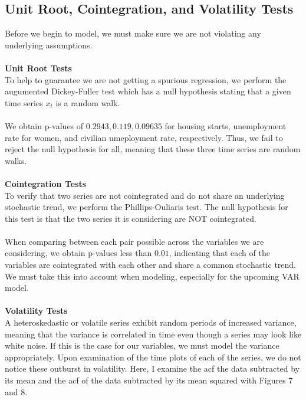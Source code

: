 \documentclass[11pt]{article}
\begin{document}
\subsection{Unit Root, Cointegration, and Volatility Tests}
Before we begin to model, we must make sure we are not violating any underlying assumptions.
\\\\
\textbf{Unit Root Tests}
\\
To help to guarantee we are not getting a spurious regression, we perform the augumented Dickey-Fuller test which has a null hypothesis stating that a given time series $x_t$ is a random walk.
\\\\
We obtain p-values of $0.2943, 0.119, 0.09635$ for housing starts, unemployment rate for women, and civilian umeployment rate, respectively. Thus, we fail to reject the null hypothesis for all, meaning that these three time series are random walks.
\\\\
\textbf{Cointegration Tests}
\\
To verify that two series are not cointegrated and do not share an underlying stochastic trend, we perform the Phillips-Ouliaris test. The null hypothesis for this test is that the two series it is considering are NOT cointegrated.
\\\\
When comparing between each pair possible across the variables we are considering, we obtain p-values less than $0.01$, indicating that each of the variables are cointegrated with each other and share a common stochastic trend. We must take this into account when modeling, especially for the upcoming VAR model.
\\\\
\textbf{Volatility Tests}
\\
A heteroskedastic or volatile series exhibit random periods of increased variance, meaning that the variance is correlated in time even though a series may look like white noise. If this is the case for our variables, we must model the variance appropriately. Upon examination of the time plots of each of the series, we do not notice these outburst in volatility. Here, I examine the acf the data subtracted by its mean and the acf of the data subtracted by its mean squared with Figures 7 and 8.
\end{document}
